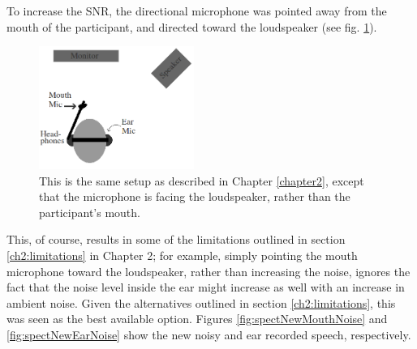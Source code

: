 \documentclass[dissertation,copyright]{uathesis}
\begin{document}
To increase the SNR, the directional microphone was pointed away from the mouth of the participant, and directed toward the loudspeaker (see fig. \ref{fig:overallSetUp_new}).  
%
\begin{figure}
\centering
  \includegraphics[width=0.45\textwidth]{figure/overallSetUp_new.png}
  \caption{This is the same setup as described in Chapter \ref{chapter2}, except that the microphone is facing the loudspeaker, rather than the participant's mouth.}
  \label{fig:overallSetUp_new}
\end{figure}
%
This, of course, results in some of the limitations outlined in section \ref{ch2:limitations} in Chapter 2; for example, simply pointing the mouth microphone toward the loudspeaker, rather than increasing the noise, ignores the fact that the noise level inside the ear might increase as well with an increase in ambient noise.  Given the alternatives outlined in section \ref{ch2:limitations}, this was seen as the best available option.  Figures \ref{fig:spectNewMouthNoise} and \ref{fig:spectNewEarNoise} show the new noisy and ear recorded speech, respectively.
%
\end{document}
